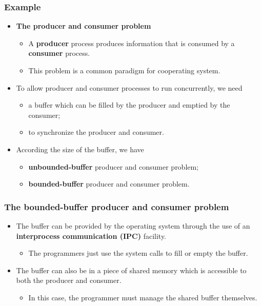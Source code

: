 \documentclass[CJKutf8,xcolor=pdftex,dvipsnames,table]{beamer}
\begin{document}
\begin{CJK*}{UTF8}{song}
  \begin{frame}
  \frametitle{Example} \pause
  \begin{itemize}
  \item{\textbf{The producer and consumer problem}} \pause
    \begin{itemize}
    \item{A \textbf{producer} process produces information that is consumed by a \textbf{consumer} process.} \pause
    \item{This problem is a common paradigm for cooperating system.} \pause
    \end{itemize}
  \item{To allow producer and consumer processes to run concurrently, we need} \pause
    \begin{itemize}
    \item{a buffer which can be filled by the producer and emptied by the consumer;} \pause
    \item{to synchronize the producer and consumer.} \pause
    \end{itemize}
  \item{According the size of the buffer, we have} \pause
    \begin{itemize}
    \item{\textbf{unbounded-buffer} producer and consumer problem;} \pause
    \item{\textbf{bounded-buffer} producer and consumer problem.}
    \end{itemize}
  \end{itemize}
  \end{frame}

\iffalse

  \begin{frame}
  \frametitle{The bounded-buffer producer and consumer problem} \pause
  \begin{itemize}
  \item{The buffer can be provided by the operating system through the use of an \textbf{interprocess communication (IPC)} facility.} \pause
    \begin{itemize}
    \item{The programmers just use the system calls to fill or empty the buffer.} \pause
    \end{itemize}
  \item{The buffer can also be in a piece of shared memory which is accessible to both the producer and consumer.} \pause
    \begin{itemize}
    \item{In this case, the programmer must manage the shared buffer themselves.}
    \end{itemize}
  \end{itemize}
  \end{frame}


\end{CJK*}
\end{document}
